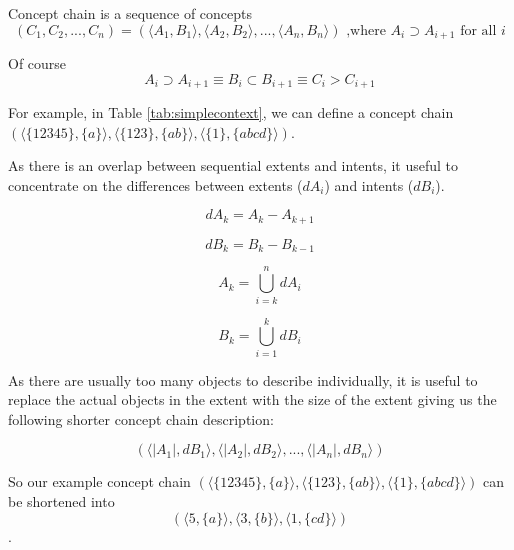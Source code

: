 \documentclass[acmconf,authordraft]{acmart}
\begin{document}
Concept chain is a sequence of concepts
\begin{equation}
  (C_1, C_2,..., C_n) = (\langle A_1, B_1 \rangle,\langle A_2,B_2 \rangle,  ..., \langle A_n,B_n \rangle)  \text{ ,where  }  A_i \supset  A_{i+1} \text{ for all } i
\end{equation}

Of course
\begin{displaymath}
A_i \supset A_{i+1} \equiv B_i \subset B_{i+1} \equiv C_i > C_{i+1}
\end{displaymath}

For example, in Table \ref{tab:simplecontext}, we can define a concept chain 
$(\langle \{12345\}, \{a\} \rangle,
 \langle \{123\}, \{ab\} \rangle,  
 \langle \{1\}, \{abcd\} \rangle)$.

As there is an overlap between sequential extents and intents, it useful to concentrate on the differences between extents ($dA_i$) and intents ($dB_i$).

\begin{equation}
dA_k = A_k - A_{k+1}
\end{equation}

\begin{equation}
dB_k = B_k - B_{k-1}
\end{equation}

\begin{equation}
A_k = \bigcup_{i=k}^{n} dA_i
\end{equation}

\begin{equation}
B_k = \bigcup_{i=1}^{k} dB_i
\end{equation}

As there are usually too many objects to describe  individually, it is useful to replace the actual objects in the extent with the size of the extent giving us the following shorter concept chain description:

\begin{displaymath}
 (\langle|A_1|, dB_1 \rangle,\langle |A_2|, dB_2 \rangle,  ..., \langle |A_n|, dB_n \rangle)
\end{displaymath}

So our example concept chain 
$(\langle \{12345\}, \{a\} \rangle,
 \langle \{123\}, \{ab\} \rangle,  \langle \{1\}, \{abcd\} \rangle)$
 can be shortened into
 \begin{displaymath}
 (\langle 5, \{a\} \rangle,
 \langle 3, \{b\} \rangle,  
 \langle 1, \{cd\} \rangle)
 \end{displaymath}.
\end{document}
